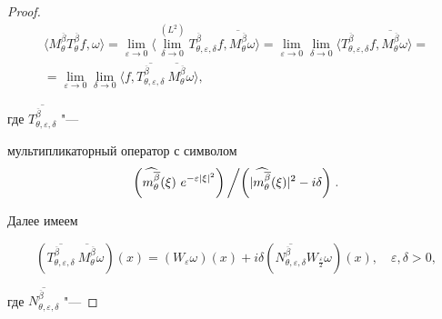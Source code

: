\begin{proof}
\begin{multline}
\langle M_\theta^{\overline{\beta}}T_\theta^{\overline{\beta}}f,

 \omega\rangle=\lim\limits_{\varepsilon\to 0}\langle \lim\limits_{\delta\to

0}^{(L^2)} T_{\theta,\varepsilon,\delta}^{\overline{\beta}}f,

 \overline{M_\theta^{\overline{\beta}}}\omega\rangle=\lim\limits_{\varepsilon\to 0}\lim\limits_{\delta\to

0}\langle T_{\theta,\varepsilon,\delta}^{\overline{\beta}}f,

 \overline{M_\theta^{\overline{\beta}}}\omega\rangle=

\\[10pt]

=\lim\limits_{\varepsilon\to 0}\lim\limits_{\delta\to 0}\langle f,

 \overline{T_{\theta,\varepsilon,\delta}^{\overline{\beta}}}\

 \overline{M_\theta^{\overline{\beta}}}\omega\rangle,

\end{multline}

где $\overline{T_{\theta,\varepsilon,\delta}^{\overline{\beta}}}$ "---

мультипликаторный оператор с символом \begin{equation}

 \left({{{\widehat{m_{\theta}^{\overline{\beta}}}(\xi)}}\

 e^{-\varepsilon|\xi|^2}}\right)

\left/\left({|\widehat{m_{\theta}^{\overline{\beta}}}(\xi)|^2-i\delta}\right)\right..\nonumber

\end{equation}

 Далее имеем

\begin{equation}\label{4.90}

(\overline{T_{\theta,\varepsilon,\delta}^{\overline{\beta}}}\

 \overline{M_\theta^{\overline{\beta}}}\omega)(x)=(W_\varepsilon

 \omega)(x)+i\delta

 (\overline{N_{\theta,\varepsilon,\delta}^{\overline{\beta}}}W_{\frac\varepsilon 2}

 \omega)(x),\quad  \varepsilon,\delta>0,

\end{equation}

где $\overline{N_{\theta,\varepsilon,\delta}^{\overline{\beta}}}$  "---


\end{proof}
